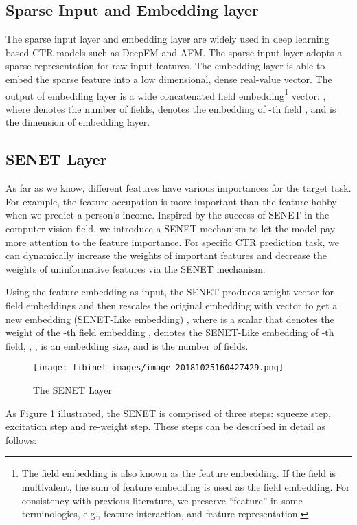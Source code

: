 \documentclass[sigconf]{acmart}
\begin{document}
\subsection{Sparse Input and Embedding
layer}
The sparse input layer and embedding layer are widely used in
deep learning based CTR models such as DeepFM\cite{guo2017deepfm} and AFM\cite{xiao2017attentional}.
The sparse input layer adopts a sparse representation for raw input
features. The embedding layer is able to embed the sparse feature into a
low dimensional, dense real-value vector. The output of embedding layer
is a wide concatenated field embedding\footnote{The field embedding is
  also known as the feature embedding. If the field is multivalent, the
  sum of feature embedding is used as the field embedding. For
  consistency with previous literature, we preserve ``feature'' in some
  terminologies, e.g., feature interaction, and feature representation.}
vector: , where  denotes
the number of fields,  denotes the embedding of -th
field , and  is the dimension of embedding layer.

\subsection{SENET Layer}
As far as we know, different features have various importances for the target task. For
example, the feature occupation is more important than the feature hobby
when we predict a person's income. Inspired by the success of SENET in
the computer vision field, we introduce a SENET mechanism to let the model pay more attention to the feature importance. For specific CTR prediction task, we can
dynamically increase the weights of important features and decrease the
weights of uninformative features via the SENET mechanism.

Using the feature embedding as input, the SENET produces weight vector  for field
embeddings and then rescales the original embedding  with vector  to get a new embedding (SENET-Like embedding) , where 
is a scalar that denotes the weight of the -th field
embedding ,  denotes the SENET-Like
embedding of -th field,  ,  
 ,  is an embedding size, and  is the number
of fields.

\begin{figure}
\centering
\texttt{[image: fibinet\_images/image-20181025160427429.png]}
\caption{The SENET Layer}
\label{fig:f2}
\end{figure}
As Figure \ref{fig:f2} illustrated, the SENET is comprised of three steps: squeeze step, excitation step and re-weight step. These steps can be described in detail as follows:
\end{document}
